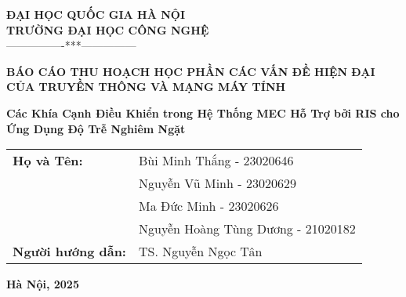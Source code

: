 
\begin{titlepage}
    \begin{center}
        \large\textbf{ĐẠI HỌC QUỐC GIA HÀ NỘI}\\
        \large\textbf{TRƯỜNG ĐẠI HỌC CÔNG NGHỆ}\\
        ----------------***---------------

        \vspace{3cm}
        {\large\textbf{BÁO CÁO THU HOẠCH HỌC PHẦN CÁC VẤN ĐỀ HIỆN ĐẠI CỦA TRUYỀN THÔNG VÀ MẠNG MÁY TÍNH}}

        \vspace{3cm}
        {\huge\textbf{Các Khía Cạnh Điều Khiển trong Hệ Thống MEC Hỗ Trợ bởi RIS cho Ứng Dụng Độ Trễ Nghiêm Ngặt}}

        \vfill
        \begin{table}[h]
            \centering
            \large
            \begin{tabular}{ll}
                \textbf{Họ và Tên:} & Bùi Minh Thắng - 23020646 \\
                \textbf{          } & Nguyễn Vũ Minh - 23020629 \\
                \textbf{          } & Ma Đức Minh - 23020626 \\
                \textbf{          } & Nguyễn Hoàng Tùng Dương - 21020182 \\
                \textbf{Người hướng dẫn:} & TS. Nguyễn Ngọc Tân \\
            \end{tabular}
        \end{table}

        \vspace{4cm}
        \textbf{Hà Nội, 2025}
        
    \end{center}
\end{titlepage}